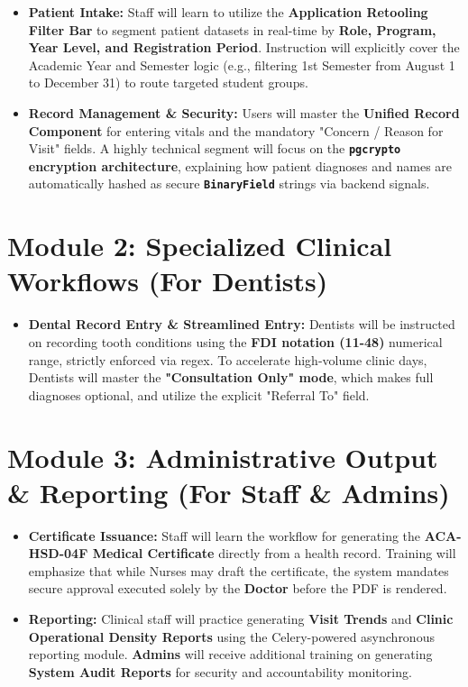 \begin{itemize}
    \item \textbf{Patient Intake:} Staff will learn to utilize the \textbf{Application Retooling Filter Bar} to segment patient datasets in real-time by \textbf{Role, Program, Year Level, and Registration Period}. Instruction will explicitly cover the Academic Year and Semester logic (e.g., filtering 1st Semester from August 1 to December 31) to route targeted student groups.
    \item \textbf{Record Management \& Security:} Users will master the \textbf{Unified Record Component} for entering vitals and the mandatory "Concern / Reason for Visit" fields. A highly technical segment will focus on the \textbf{\texttt{pgcrypto} encryption architecture}, explaining how patient diagnoses and names are automatically hashed as secure \textbf{\texttt{BinaryField}} strings via backend signals.
\end{itemize}

\section{Module 2: Specialized Clinical Workflows (For Dentists)}

\begin{itemize}
    \item \textbf{Dental Record Entry \& Streamlined Entry:} Dentists will be instructed on recording tooth conditions using the \textbf{FDI notation (11-48)} numerical range, strictly enforced via regex. To accelerate high-volume clinic days, Dentists will master the \textbf{"Consultation Only" mode}, which makes full diagnoses optional, and utilize the explicit "Referral To" field.
\end{itemize}

\section{Module 3: Administrative Output \& Reporting (For Staff \& Admins)}

\begin{itemize}
    \item \textbf{Certificate Issuance:} Staff will learn the workflow for generating the \textbf{ACA-HSD-04F Medical Certificate} directly from a health record. Training will emphasize that while Nurses may draft the certificate, the system mandates secure approval executed solely by the \textbf{Doctor} before the PDF is rendered.
    \item \textbf{Reporting:} Clinical staff will practice generating \textbf{Visit Trends} and \textbf{Clinic Operational Density Reports} using the Celery-powered asynchronous reporting module. \textbf{Admins} will receive additional training on generating \textbf{System Audit Reports} for security and accountability monitoring.
\end{itemize}

